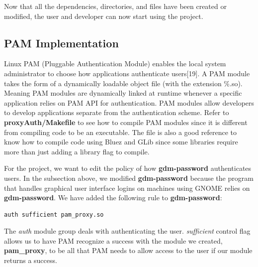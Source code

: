 \documentclass[letterpaper,twocolumn,10pt]{article}
\begin{document}
Now that all the dependencies, directories, and files have been created or modified, the user and developer can now start using the project.
\label{prerequisite}

\subsection{PAM Implementation}
Linux PAM (Pluggable Authentication Module) enables the local system administrator to choose how applications authenticate users[19]. A PAM module takes the form of a dynamically loadable object file (with the extension \%.so). Meaning PAM modules are dynamically linked at runtime whenever a specific application relies on PAM API for authentication. PAM modules allow developers to develop applications separate from the authentication scheme. Refer to \textbf{proxyAuth/Makefile} to see how to compile PAM modules since it is different from compiling code to be an executable. The file is also a good reference to know how to compile code using Bluez and GLib since some libraries require more than just adding a library flag to compile.

For the project, we want to edit the policy of how \textbf{gdm-password} authenticates users. In the subsection above, we modified \textbf{gdm-password} because the program that handles graphical user interface logins on machines using GNOME relies on \textbf{gdm-password}. We have added the following rule to \textbf{gdm-password}:
{\small
\begin{lstlisting}
auth sufficient pam_proxy.so
\end{lstlisting}
}
The \emph{auth} module group deals with authenticating the user. \emph{sufficient} control flag allows us to have PAM recognize a success with the module we created, \textbf{pam\_proxy}, to be all that PAM needs to allow access to the user if our module returns a success.
\end{document}
